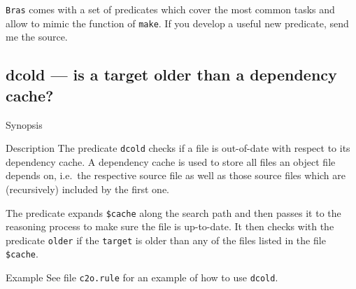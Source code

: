 \documentclass[11pt,bibtotoc,idxtotoc]{scrreprt}
\newcommand{\Bras}{\texttt{Bras}}
\newcommand{\make}{\texttt{make}}
\begin{document}
\Bras{} comes with a set of predicates which cover the most common
tasks and allow to mimic the function of \make{}. If you develop a
useful new predicate, send me the source.

\subsection{dcold --- is a target older than a dependency cache?}
\label{pred:dcold}
\begin{Describe}
\item[Synopsis]  
\item[Description] The predicate \texttt{dcold} checks if a file is
  out-of-date with respect to its dependency cache. A dependency cache
  is used to store all files an object file depends on, i.e.\ the
  respective source file as well as those source files which are
  (recursively) included by the first one.
  
  The predicate expands \texttt{\$cache} along the search path and
  then passes it to the reasoning process to make sure the file is
  up-to-date. It then checks with the predicate \texttt{older} if the
  \texttt{target} is older than any of the files listed in the file
  \texttt{\$cache}.
\item[Example] See file \texttt{c2o.rule} for an example of how to use 
  \texttt{dcold}.
\end{Describe}


\end{document}
